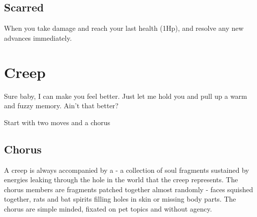 \documentclass{tufte-book}
\begin{document}
\section{Scarred}
When you take damage and reach your last health (1Hp),  and resolve any new advances immediately. 



\chapter{Creep} %

Sure baby, I can make you feel better. Just let me hold you and pull up a warm and fuzzy memory. Ain't that better?


Start with two moves and a chorus

\section{Chorus}
A creep is always accompanied by a  -  a collection of soul fragments sustained by energies leaking through the hole in the world that the creep represents. The chorus members are fragments patched together almost randomly - faces squished together, rats and bat spirits filling holes in skin or missing body parts. The chorus are simple minded, fixated on pet topics and without agency.
\end{document}
